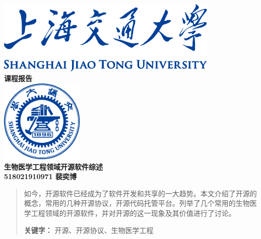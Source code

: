 \documentclass[UTF8]{ctexart}
\begin{document}

\begin{titlepage}
    \begin{center}
        \includegraphics[width=0.8\textwidth]{sjtu-name-blue.pdf}\\[1cm]
        \textsc{\Huge \bfseries 课程报告}\\[1.5cm]
        \includegraphics[width=0.3\textwidth]{sjtu-badge-blue.pdf}\\[0.5cm]    

        \Huge \bfseries{生物医学工程领域开源软件综述}\\[1cm]
        \Large \bfseries{518021910971 裴奕博}
    \end{center}
\end{titlepage}
\tableofcontents
\newpage

\begin{abstract}
    如今，开源软件已经成为了软件开发和共享的一大趋势。本文介绍了开源的概念，常用的几种开源协议，开源代码托管平台。列举了几个常用的生物医学工程领域的开源软件，并对开源的这一现象及其价值进行了讨论。
    
    \textbf{关键字：} 开源、开源协议、生物医学工程
\end{abstract}
\end{document}
